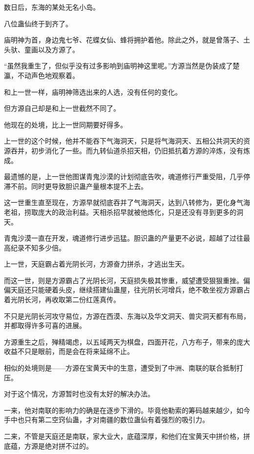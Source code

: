 
\begin{this_body}



数日后，东海的某处无名小岛。

八位蛊仙终于到齐了。

庙明神为首，身边鬼七爷、花蝶女仙、蜂将拥护着他。除此之外，就是曾落子、土头驮、童画以及方源了。

“虽然我重生了，但似乎没有过多影响到庙明神这里呢。”方源当然是伪装成了楚瀛，不动声色地观察着。

和上一世一样，庙明神筛选出来的人选，没有任何的变化。

但方源自己却是和上一世截然不同了。

他现在的处境，比上一世同期要好得多。

上一世的这个时候，他并不能吞下气海洞天，只是将气海洞天、五相公共洞天的资源吞并，初步消化了一些。而九转仙道杀招天相，仍旧抵抗着方源的淬炼，没有炼成。

最遗憾的是，上一世他图谋青鬼沙漠的计划彻底告吹，魂道修行严重受阻，几乎停滞不前。同时更导致胆识蛊产量根本提不上去。

这一世重生直至现在，方源早就彻底吞并了气海洞天，达到八转修为，更化身气海老祖，捞取庞大的政治利益。天相杀招早就被他炼化，只是还没有寻到更多的洞天。

青鬼沙漠一直在开发，魂道修行进步迅猛。胆识蛊的产量更不必说，超越了过往最高纪录不知多少倍。

上一世，天庭霸占着光阴长河，方源奋力拼杀，才逃出生天。

而这一世，则是方源霸占了光阴长河，天庭损失极其惨重，威望遭受狠狠重挫。偏偏天庭还只能硬着头皮，继续搭建仙蛊屋，往光阴长河增兵，绝不敢坐视方源霸占着光阴长河，再收取第二份红莲真传。

不只是光阴长河攻守易位，方源在西漠、东海以及华文洞天、兽灾洞天都有布局，并都取得许多可喜的进展。

方源重生之后，殚精竭虑，以五域两天为棋盘，四面开花，八方布子，带来的庞大收益不只是眼前，而是会在将来延绵不止。

相似的处境则是——方源在宝黄天中的生意，遭受到了中洲、南联的联合抵制打压。

对于这个情况，方源暂时也没有太好的解决办法。

一来，他对南联的影响力的确是在逐步下滑的。毕竟他勒索的筹码越来越少，如今手中也只有第二空窍仙蛊，才对南疆的数位蛊仙有着强烈的吸引力。

二来，不管是天庭还是南联，家大业大，底蕴深厚，和他们在宝黄天中拼价格，拼底蕴，方源是绝对拼不过的。


\end{this_body}
